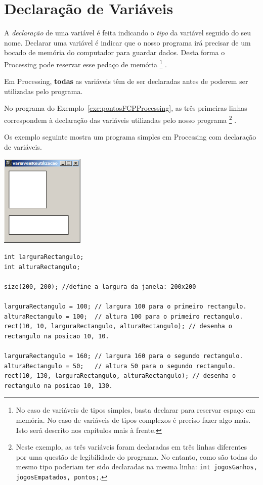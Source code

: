 \section{Declaração de Variáveis}
A \emph{declaração} de uma variável é feita indicando o \emph{tipo} da variável seguido do seu nome. Declarar uma variável é indicar que o nosso programa irá precisar de um bocado de memória do computador para guardar dados. Desta forma o Processing pode reservar esse pedaço de memória%
\footnote{No caso de variáveis de tipos simples, basta declarar para reservar espaço em memória. No caso de variáveis de tipos complexos é preciso fazer algo mais. Isto será descrito nos capítulos mais à frente.}%
.

Em Processing, \textbf{todas} as variáveis têm de ser declaradas antes de poderem ser utilizadas pelo programa.

No programa do Exemplo~\ref{exe:pontosFCPProcessing}, as três primeiras linhas correspondem à declaração das variáveis utilizadas pelo nosso programa%
\footnote{Neste exemplo, as três variáveis foram declaradas em três linhas diferentes por uma questão de legibilidade do programa. No entanto, como são todas do mesmo tipo poderiam ter sido declaradas na mesma linha: \texttt{int jogosGanhos, jogosEmpatados, pontos;}.}%
.

Os exemplo seguinte mostra um programa simples em Processing com declaração de variáveis.

\begin{minipage}{\textwidth}
\begin{center}
	\includegraphics[width=4cm]{images/variaveisReutilizacao.eps}
\end{center}
\begin{lstlisting}[caption=Reutilização de variáveis, label=exe:variaveisReutilizacao]
int larguraRectangulo;
int alturaRectangulo;

size(200, 200); //define a largura da janela: 200x200

larguraRectangulo = 100; // largura 100 para o primeiro rectangulo.
alturaRectangulo = 100;  // altura 100 para o primeiro rectangulo.
rect(10, 10, larguraRectangulo, alturaRectangulo); // desenha o rectangulo na posicao 10, 10.

larguraRectangulo = 160; // largura 160 para o segundo rectangulo.
alturaRectangulo = 50;   // altura 50 para o segundo rectangulo.
rect(10, 130, larguraRectangulo, alturaRectangulo); // desenha o rectangulo na posicao 10, 130.
\end{lstlisting}
\end{minipage}

